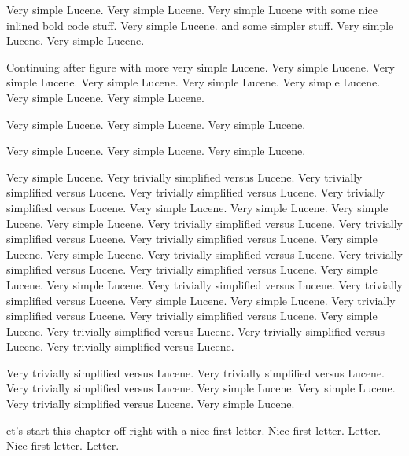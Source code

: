 \documentclass[10pt]{book}
\newcommand{\firstchar}[1]{\noindent{\huge\bf #1}}
\begin{document}
Very simple Lucene.
Very simple Lucene.
Very simple Lucene with some nice inlined
bold code
 stuff.
Very simple Lucene.
and some simpler  stuff.
Very simple Lucene.
Very simple Lucene.

%

\noindent
Continuing after figure with more very simple Lucene.
Very simple Lucene.
Very simple Lucene.
Very simple Lucene.
Very simple Lucene.
Very simple Lucene.
Very simple Lucene.
Very simple Lucene.

Very simple Lucene.
Very simple Lucene.
Very simple Lucene.


Very simple Lucene.
Very simple Lucene.
Very simple Lucene.

Very simple Lucene.
Very trivially simplified versus  Lucene.
Very trivially simplified versus  Lucene.
Very trivially simplified versus  Lucene.
Very trivially simplified versus  Lucene.
Very simple Lucene.
Very simple Lucene.
Very simple Lucene.
Very simple Lucene.
Very trivially simplified versus  Lucene.
Very trivially simplified versus  Lucene.
Very trivially simplified versus  Lucene.
Very simple Lucene.
Very simple Lucene.
Very trivially simplified versus  Lucene.
Very trivially simplified versus  Lucene.
Very trivially simplified versus  Lucene.
Very simple Lucene.
Very simple Lucene.
Very trivially simplified versus  Lucene.
Very trivially simplified versus  Lucene.
Very simple Lucene.
Very simple Lucene.
Very trivially simplified versus  Lucene.
Very trivially simplified versus  Lucene.
Very simple Lucene.
Very trivially simplified versus  Lucene.
Very trivially simplified versus  Lucene.
Very trivially simplified versus  Lucene.


Very trivially simplified versus  Lucene.
Very trivially simplified versus  Lucene.
Very trivially simplified versus  Lucene.
Very simple Lucene.
Very simple Lucene.
Very trivially simplified versus  Lucene.
Very simple Lucene.


\firstchar{L}et's start this chapter off right with a nice
first letter.  Nice first letter. Letter.
Nice first letter. Letter.

\end{document}
